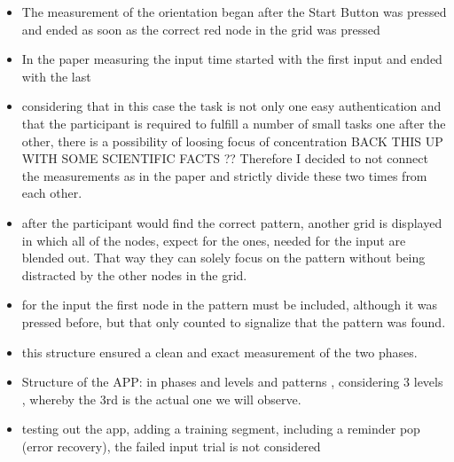 \begin{itemize}
\item The measurement of the orientation began after the Start Button was pressed and ended as soon as the correct red node in the grid was pressed 
\item In the paper measuring the input time started with the first input and ended with the last 
\item considering that in this case the task is not only one easy authentication and that the participant is required to fulfill a number of small tasks one after the other, there is a possibility of loosing focus of concentration 
BACK THIS UP WITH SOME SCIENTIFIC FACTS ??
Therefore I decided to not connect the measurements as in the paper and strictly divide these two times from each other. 
\item after the participant would find the correct pattern, another grid is displayed in which all of the nodes, expect for the ones, needed for the input are blended out. 
That way they can solely focus on the pattern without being distracted by the other nodes in the grid. 
\item for the input the first node in the pattern must be included, although it was pressed before, but that only counted to signalize that the pattern was found. 
\item this structure ensured a clean and exact measurement of the two phases. 

\item Structure of the APP: in phases and levels and patterns , considering 3 levels , whereby the 3rd is the actual one we will observe. 

\item testing out the app, adding a training segment, including a reminder pop (error recovery), the failed input trial is not considered 

\end{itemize}

